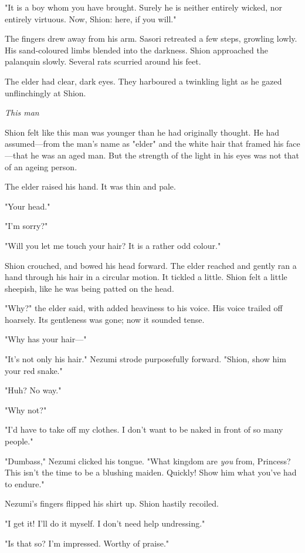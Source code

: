 "It is a boy whom you have brought. Surely he is neither entirely
wicked, nor entirely virtuous. Now, Shion: here, if you will."

The fingers drew away from his arm. Sasori retreated a few steps,
growling lowly. His sand-coloured limbs blended into the darkness. Shion
approached the palanquin slowly. Several rats scurried around his feet.~

The elder had clear, dark eyes. They harboured a twinkling light as he
gazed unflinchingly at Shion.

\emph{This man\el }

Shion felt like this man was younger than he had originally thought. He
had assumed---from the man's name as "elder" and the white hair that
framed his face---that he was an aged man. But the strength of the light
in his eyes was not that of an ageing person.

The elder raised his hand. It was thin and pale.

"Your head."

"I'm sorry?"

"Will you let me touch your hair? It is a rather odd colour."

Shion crouched, and bowed his head forward. The elder reached and gently
ran a hand through his hair in a circular motion. It tickled a little.
Shion felt a little sheepish, like he was being patted on the head.

"Why?" the elder said, with added heaviness to his voice. His voice
trailed off hoarsely. Its gentleness was gone; now it sounded tense.

"Why has your hair---"

"It's not only his hair." Nezumi strode purposefully forward. "Shion,
show him your red snake."

"Huh? No way."

"Why not?"

"I'd have to take off my clothes. I don't want to be naked in front of
so many people."

"Dumbass," Nezumi clicked his tongue. "What kingdom are \emph{you} from,
Princess? This isn't the time to be a blushing maiden. Quickly! Show him
what you've had to endure."

Nezumi's fingers flipped his shirt up. Shion hastily recoiled.

"I get it! I'll do it myself. I don't need help undressing."

"Is that so? I'm impressed. Worthy of praise."

